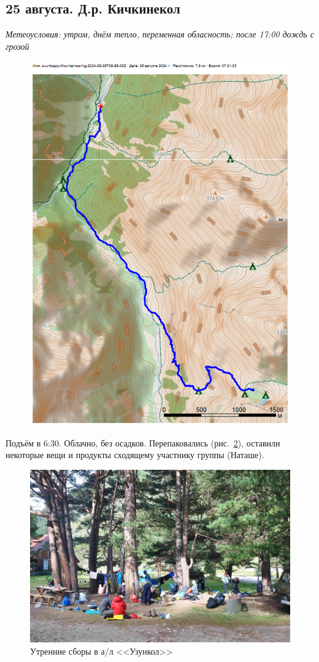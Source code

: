 \subsection{25 августа. Д.р. Кичкинекол}
\textit{Метеоусловия: утром, днём тепло, переменная обласность; после 17:00 дождь с грозой}

\begin{figure}[h!]
	\centering
	\includegraphics[angle=0, width=0.7\linewidth]{../pics/mini_maps/25}
	\label{fig:mini_25}
\end{figure}

Подъём в 6:30. Облачно, без осадков. Перепаковались (рис.~\ref{fig:DSC_0126.JPG}), оставили некоторые вещи и продукты сходящему участнику группы (Наташе). 

\begin{figure}[h!]
	\centering
	\includegraphics[width=0.7\linewidth]{../pics/DSC_0126.JPG}
	\caption{Утренние сборы в а/л <<Узункол>>}
	\label{fig:DSC_0126.JPG}
\end{figure}

